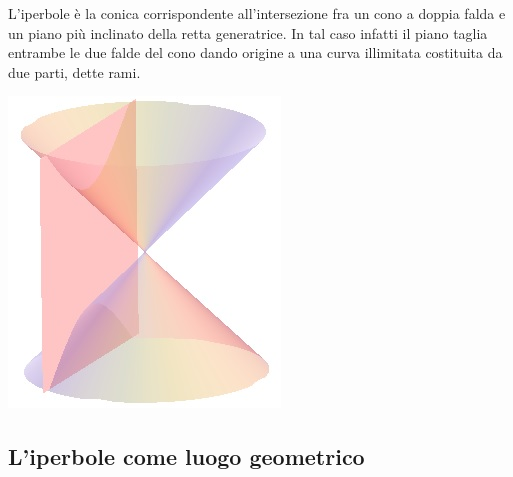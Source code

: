 \noindent\begin{minipage}{.75\textwidth}
L'iperbole è la conica corrispondente all'intersezione fra un cono a doppia 
falda e un piano più inclinato della retta generatrice. In tal caso infatti il piano 
taglia entrambe le due falde del cono dando origine a una curva illimitata 
costituita da due parti, dette rami.
\end{minipage}
\hspace{.5cm}
\begin{minipage}{.2\textwidth}
  \includegraphics[width=\textwidth]{img/iperbole2.jpg}
\end{minipage}  

\subsection{L'iperbole come luogo geometrico}
\label{subsec:iperbole_luogogeometrico}

